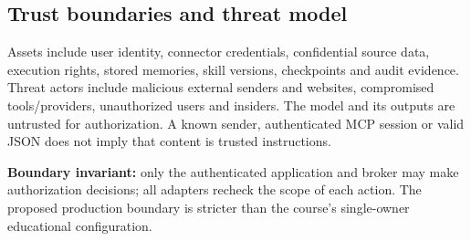 \documentclass[11pt,letterpaper]{article}
\begin{document}
\subsection{Trust boundaries and threat model}
Assets include user identity, connector credentials, confidential source data, execution rights, stored memories, skill versions, checkpoints and audit evidence. Threat actors include malicious external senders and websites, compromised tools/providers, unauthorized users and insiders. The model and its outputs are untrusted for authorization. A known sender, authenticated MCP session or valid JSON does not imply that content is trusted instructions.
\begin{center}\end{center}
\textbf{Boundary invariant:} only the authenticated application and broker may make authorization decisions; all adapters recheck the scope of each action. The proposed production boundary is stricter than the course's single-owner educational configuration.
\end{document}
